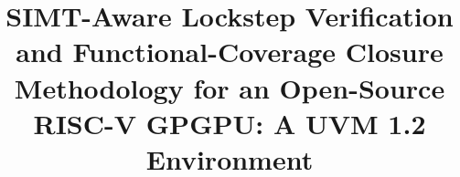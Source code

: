 \documentclass[conference]{IEEEtran}
\begin{document}
\title{SIMT-Aware Lockstep Verification and Functional-Coverage Closure
	Methodology for an Open-Source RISC-V GPGPU: A UVM 1.2 Environment}

%

\maketitle
\end{document}
